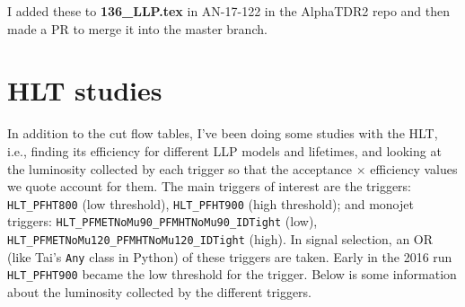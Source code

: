 I added these to \textbf{136\_LLP.tex} in AN-17-122 in the AlphaTDR2 repo and then made a PR to merge it into the master branch.


\section{HLT studies}

In addition to the cut flow tables, I've been doing some studies with the HLT, i.e., finding its efficiency for different LLP models and lifetimes, and looking at the luminosity collected by each trigger so that the acceptance $\times$ efficiency values we quote account for them. The main triggers of interest are the \HT triggers: \texttt{HLT\_PFHT800} (low threshold), \texttt{HLT\_PFHT900} (high threshold); and monojet triggers: \texttt{HLT\_PFMETNoMu90\_PFMHTNoMu90\_IDTight} (low),  \texttt{HLT\_PFMETNoMu120\_PFMHTNoMu120\_IDTight} (high). In signal selection, an OR (like Tai's \texttt{Any} class in Python) of these triggers are taken. Early in the 2016 run \texttt{HLT\_PFHT900} became the low threshold for the \HT trigger. Below is some information about the luminosity collected by the different triggers.

\begin{table}[H]
\caption{The luminosity collected by each HLT, or combination of Triggers, from the entire 2016 run. Over the course of the run, the threshold for the lowest unprescaled trigger in each category rose. The fraction of luminosity collected by each Trigger whilst it was lowest threshold is included.}
\end{table}


